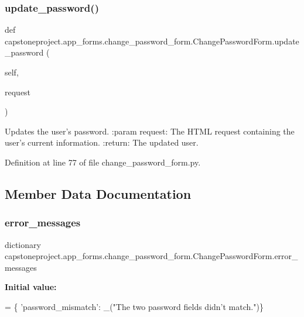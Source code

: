 \subsubsection{\texorpdfstring{update\+\_\+password()}{update\_password()}}
{\footnotesize\ttfamily def capstoneproject.\+app\+\_\+forms.\+change\+\_\+password\+\_\+form.\+Change\+Password\+Form.\+update\+\_\+password (\begin{DoxyParamCaption}\item[{}]{self,  }\item[{}]{request }\end{DoxyParamCaption})}

\begin{DoxyVerb}Updates the user's password.
:param request: The HTML request containing the user's current information.
:return: The updated user.
\end{DoxyVerb}
 

Definition at line 77 of file change\+\_\+password\+\_\+form.\+py.



\subsection{Member Data Documentation}
\mbox{\label{classcapstoneproject_1_1app__forms_1_1change__password__form_1_1_change_password_form_ad148e8724efaabbf3ab9d0aa972e32da}} 
\subsubsection{\texorpdfstring{error\+\_\+messages}{error\_messages}}
{\footnotesize\ttfamily dictionary capstoneproject.\+app\+\_\+forms.\+change\+\_\+password\+\_\+form.\+Change\+Password\+Form.\+error\+\_\+messages\hspace{0.3cm}{\ttfamily [static]}}

{\bfseries Initial value\+:}
\begin{DoxyCode}
=  \{
        \textcolor{stringliteral}{'password\_mismatch'}: \_(\textcolor{stringliteral}{"The two password fields didn't match."})\}
\end{DoxyCode}


